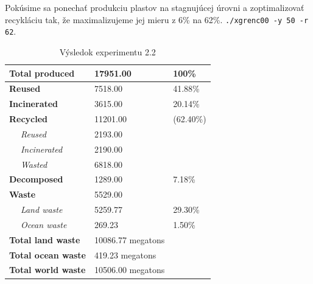 \documentclass[a4paper, 11pt]{article}
\begin{document}
Pokúsime sa ponechať produkciu plastov na stagnujúcej úrovni a zoptimalizovať recykláciu tak, že maximalizujeme jej mieru z 6\% na 62\%.
\texttt{./xgrenc00 -y 50 -r 62}.

\begin{table}[ht]
	\centering
	\begin{tabular}{|l|l|l|l|}
		\hline
		\multicolumn{2}{|l|}{\textbf{Total produced}}    & 17951.00             & 100\%               \\ \hline
		\multicolumn{2}{|l|}{\textbf{Reused}}            & 7518.00              & 41.88\%             \\ \hline
		\multicolumn{2}{|l|}{\textbf{Incinerated}}       & 3615.00              & 20.14\%             \\ \hline
		\multicolumn{2}{|l|}{\textbf{Recycled}}          & 11201.00             & (62.40\%)           \\ \hline
		                                                 & \textit{Reused}      & 2193.00   &         \\ \hline
		                                                 & \textit{Incinerated} & 2190.00   &         \\ \hline
		                                                 & \textit{Wasted}      & 6818.00   &         \\ \hline
		\multicolumn{2}{|l|}{\textbf{Decomposed}}        & 1289.00              & 7.18\%              \\ \hline
		\multicolumn{2}{|l|}{\textbf{Waste}}             & 5529.00              &                     \\ \hline
		                                                 & \textit{Land waste}  & 5259.77   & 29.30\% \\ \hline
		                                                 & \textit{Ocean waste} & 269.23    & 1.50\%  \\ \hline
		\multicolumn{2}{|l|}{\textbf{Total land waste}}  & 10086.77 megatons    &                     \\ \hline
		\multicolumn{2}{|l|}{\textbf{Total ocean waste}} & 419.23 megatons      &                     \\ \hline
		\multicolumn{2}{|l|}{\textbf{Total world waste}} & 10506.00 megatons    &                     \\ \hline
	\end{tabular}
	\caption{Výsledok experimentu 2.2}
	\label{tab:3}
\end{table}
\end{document}
